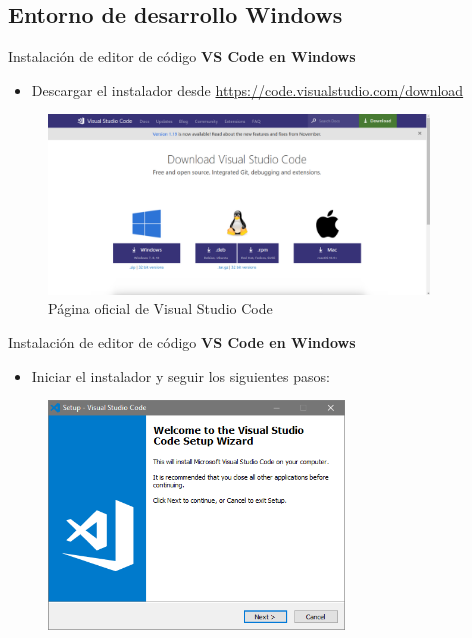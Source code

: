 \subsection{Entorno de desarrollo Windows}


\begin{frame}[fragile]{Instalación de editor de código}
  \textbf{VS Code en Windows}
  \begin{itemize}
    \item Descargar el instalador desde \url{https://code.visualstudio.com/download}
  \end{itemize}  
    \begin{figure}
      \includegraphics[width=0.9\textwidth]{./resources/1.png}
      \caption*{Página oficial de Visual Studio Code}
    \end{figure}
\end{frame}


\begin{frame}[fragile]{Instalación de editor de código}
  \textbf{VS Code en Windows}
   \begin{itemize}
    \item Iniciar el instalador y seguir los siguientes pasos:
   \end{itemize} 
   \begin{figure}
      \includegraphics[width=0.7\textwidth]{./resources/VSCODE_Step_01.PNG}
   \end{figure}
\end{frame}

